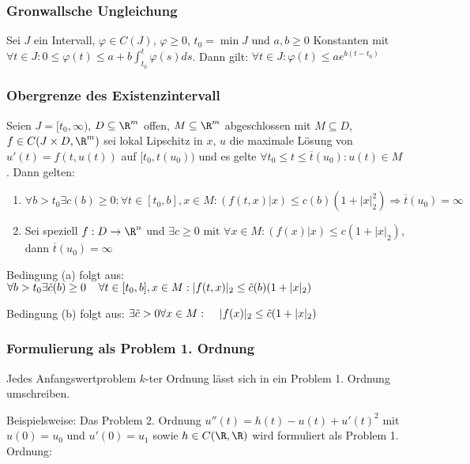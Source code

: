 \subsubsection*{Gronwallsche Ungleichung}

Sei $J$ ein Intervall, $\varphi \in C(J)$, $\varphi \geq 0$, $t_0 = \min J$ und $a, b \geq 0$ Konstanten mit $\forall t \in J : 0 \leq \varphi(t) \leq a+b \int_{t_0}^t \varphi(s) ds$. Dann gilt: $\forall t \in J : \varphi(t) \leq a e^{b(t-t_0)}$

\subsubsection*{Obergrenze des Existenzintervall}

Seien $J = [t_0, \infty)$, $D \subseteq \R^m$ offen, $M \subseteq \R^m$ abgeschlossen mit $M \subseteq D$, $f \in C(J \times D, \R^m)$ sei lokal Lipschitz in $x$, $u$ die maximale Lösung von $u'(t) = f(t, u(t))$ auf $[t_0, t(u_0))$ und es gelte $\forall t_0 \leq t \leq \overline t(u_0) : u(t) \in M$. Dann gelten:

\begin{enumerate}[label=(\alph*)]
	\item $\forall b > t_0 \exists c(b) \geq 0 : \forall t \in [t_0, b], x \in M : (f(t,x)|x) \leq c(b) (1+|x|_2^2) \Rightarrow \overline t(u_0) = \infty$
	\item Sei speziell $f: D \rightarrow \R^n$ und $\exists c \geq 0$ mit $\forall x \in M : (f(x)|x) \leq c(1+|x|_2)$, dann $\overline t(u_0) = \infty$
\end{enumerate}

Bedingung (a) folgt aus: $\forall b > t_0 \exists \tilde c(b) \geq 0 \\ \hspace*{4mm} \forall t \in [t_0, b], x \in M : |f(t,x)|_2 \leq \tilde c(b)(1+|x|_2)$

Bedingung (b) folgt aus: $\exists \tilde c > 0 \forall x \in M : \\ \hspace*{4mm} |f(x)|_2 \leq \tilde c(1+|x|_2)$

\subsubsection*{Formulierung als Problem 1. Ordnung}

Jedes Anfangswertproblem $k$-ter Ordnung lässt sich in ein Problem 1. Ordnung umschreiben.

Beispielsweise: Das Problem 2. Ordnung $u''(t)=h(t)-u(t)+u'(t)^2$ mit $u(0)=u_0$ und $u'(0)=u_1$ sowie $h \in C(\R, \R)$ wird formuliert als Problem 1. Ordnung:

